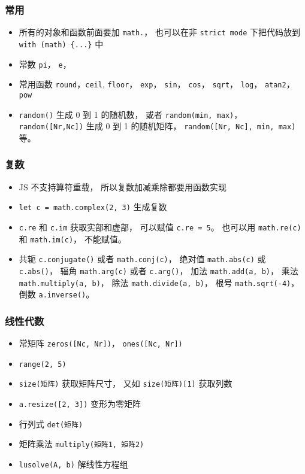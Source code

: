 \subsubsection{常用}
\begin{itemize}
\item 所有的对象和函数前面要加 \verb|math.|， 也可以在非 \verb|strict mode| 下把代码放到 \verb|with (math) {...}| 中
\item 常数 \verb|pi|， \verb|e|， 
\item 常用函数 \verb|round|，\verb|ceil|, \verb|floor|， \verb|exp|， \verb|sin|， \verb|cos|， \verb|sqrt|， \verb|log|， \verb|atan2|， \verb|pow|
\item \verb|random()| 生成 0 到 1 的随机数， 或者 \verb|random(min, max)|， \verb|random([Nr,Nc])| 生成 0 到 1 的随机矩阵， \verb|random([Nr, Nc], min, max)| 等。
\end{itemize}

\subsubsection{复数}
\begin{itemize}
\item JS 不支持算符重载， 所以复数加减乘除都要用函数实现
\item \verb|let c = math.complex(2, 3)| 生成复数
\item \verb|c.re| 和 \verb|c.im| 获取实部和虚部， 可以赋值 \verb|c.re = 5|。 也可以用 \verb|math.re(c)| 和 \verb|math.im(c)|， 不能赋值。
\item 共轭 \verb|c.conjugate()| 或者 \verb|math.conj(c)|， 绝对值 \verb|math.abs(c)| 或 \verb|c.abs()|， 辐角 \verb|math.arg(c)| 或者 \verb|c.arg()|， 加法 \verb|math.add(a, b)|， 乘法 \verb|math.multiply(a, b)|， 除法 \verb|math.divide(a, b)|， 根号 \verb|math.sqrt(-4)|， 倒数 \verb|a.inverse()|。
\end{itemize}

\subsubsection{线性代数}
\begin{itemize}
\item 常矩阵 \verb|zeros([Nc, Nr])|， \verb|ones([Nc, Nr])|
\item \verb|range(2, 5)|
\item \verb|size(矩阵)| 获取矩阵尺寸， 又如 \verb|size(矩阵)[1]| 获取列数
\item \verb|a.resize([2, 3])| 变形为零矩阵
\item 行列式 \verb|det(矩阵)|
\item 矩阵乘法 \verb|multiply(矩阵1, 矩阵2)|
\item \verb|lusolve(A, b)| 解线性方程组
\end{itemize}

